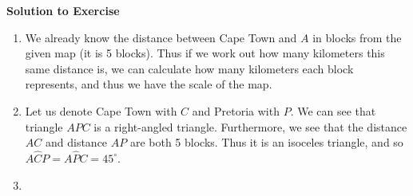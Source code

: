 {\begin{mdframed}[linewidth=4, leftmargin=40, rightmargin=40]
\begin{exercise}
\begin{figure}[H]
\begin{center}
      \vspace{2pt}
    \vspace{.1in}
    \end{center}
 \end{figure}       
        \par 
        \vspace{5pt}
        \label{m39411*solfhsst!!!underscore!!!id1611}\noindent\textbf{Solution to Exercise } \label{m39411*listfhsst!!!underscore!!!id1611}\begin{enumerate}[noitemsep, label=\textbf{Step} \textbf{\arabic*}. ] 
            \leftskip=20pt\rightskip=\leftskip\item  
        \label{m39411*id82688}We already know the distance between Cape Town and \begin{math}A\end{math} in blocks from the given map (it is 5 blocks). Thus if we work out how many kilometers this same distance is, we can calculate how many kilometers each block represents, and thus we have the scale of the map.\par 
        \item  
        \label{m39411*id82707}Let us denote Cape Town with \begin{math}C\end{math} and Pretoria with \begin{math}P\end{math}.
We can see that triangle \begin{math}APC\end{math} is a right-angled triangle. Furthermore, we see that the distance \begin{math}AC\end{math} and distance \begin{math}AP\end{math} are both 5 blocks. Thus it is an isoceles triangle, and so \begin{math}A\hat{C}P=A\hat{P}C={45}^{\circ }\end{math}.\par 
        \item  
        \label{m39411*id82816}\nopagebreak\noindent{}
\end{enumerate}
\end{exercise}
\end{mdframed}}
